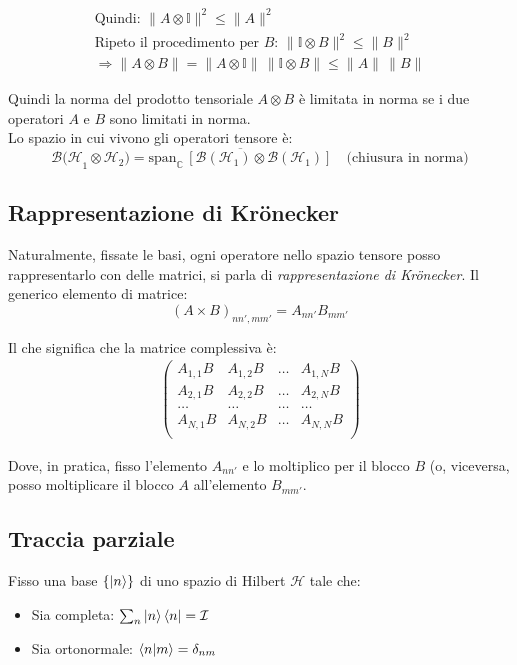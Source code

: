 \begin{gather}
\mbox{Quindi: } \|  A \otimes \mathbb{I} \|^2 \leq \| A \|^2 \\
\mbox{Ripeto il procedimento per } B:\,   \|  \mathbb{I} \otimes B \|^2 \leq \| B \|^2 \\
 \Longrightarrow \| A \otimes B \| = \| A \otimes \mathbb{I} \| \, \|\mathbb{I} \otimes B \| \leq \|A\| \, \|B\|   
\end{gather}

Quindi la norma del prodotto tensoriale  $A \otimes B $ è limitata in norma se i due operatori $A$ e $B$ sono limitati in norma.\\
Lo spazio in cui vivono gli operatori tensore è:
$$
\mathcal{B({H}}_1 \otimes \mathcal{H}_2) =\overline{\textrm{span}_{\mathbb{C}} \, \left[ \mathcal{B}(\mathcal{H}_1) \otimes \mathcal{B}(\mathcal{H}_1) \right]} 
\quad
\text{(chiusura in norma)}
$$

\subsection{Rappresentazione di Krönecker} %
Naturalmente, fissate le basi, ogni operatore nello spazio tensore posso rappresentarlo con delle matrici, si parla di \emph{rappresentazione di Krönecker}.
Il generico elemento di matrice:
\begin{equation}
(A\times B)_{nn',mm'}=A_{nn'} B_{mm'}
\end{equation}

Il che significa che la matrice complessiva è:
\begin{equation}\begin{split}
\left(\begin{matrix}
A_{1,1}B & A_{1,2}B & \dots & A_{1,N}B\\
A_{2,1}B & A_{2,2}B & \dots & A_{2,N}B\\
\dots & \dots & \dots & \dots\\
A_{N,1}B & A_{N,2}B & \dots & A_{N,N}B\\
\end{matrix}\right)
\end{split}\end{equation}

Dove, in pratica, fisso l'elemento $A_{nn'}$ e lo moltiplico per il blocco $B$ (o, viceversa, posso moltiplicare il blocco $A$ all'elemento $B_{mm'}$.

\subsection{Traccia parziale} %
Fisso una base $\{ \ket{n} \}$ di uno spazio di Hilbert $\mathcal{H}$ tale che:
\begin{itemize}
\item Sia completa: $\sum_n \ket{n} \bra{n} = \mathcal{I}$
\item Sia ortonormale: $\braket{n|m} = \delta_{nm} $
\end{itemize}

